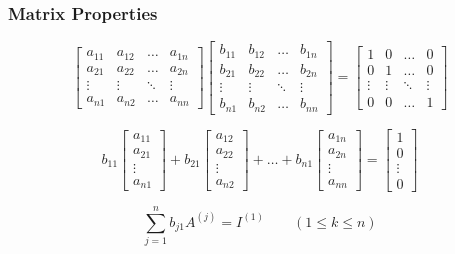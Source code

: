 \documentclass[notheorems,mathserif,table,compress]{beamer}  %
\begin{document}
\begin{frame}
\frametitle{Matrix Properties}
\begin{displaymath}
\begin{bmatrix}
a_{11} & a_{12} & \ldots & a_{1n}\\
a_{21} & a_{22} & \ldots & a_{2n}\\
\vdots & \vdots & \ddots & \vdots \\
a_{n1} & a_{n2} & \ldots & a_{nn}
\end{bmatrix}
\begin{bmatrix}
b_{11} & b_{12} & \ldots & b_{1n}\\
b_{21} & b_{22} & \ldots & b_{2n}\\
\vdots & \vdots & \ddots & \vdots \\
b_{n1} & b_{n2} & \ldots & b_{nn}
\end{bmatrix}
=\begin{bmatrix}
1 & 0 & \ldots & 0 \\
0 & 1 & \ldots & 0 \\
\vdots & \vdots & \ddots & \vdots \\
0 & 0 & \ldots & 1 
\end{bmatrix}
\end{displaymath}

\begin{displaymath}
b_{11}\begin{bmatrix}
a_{11}\\
a_{21}\\
\vdots\\
a_{n1}
\end{bmatrix}
+b_{21}\begin{bmatrix}
a_{12}\\
a_{22}\\
\vdots\\
a_{n2}
\end{bmatrix}+\ldots+b_{n1}
\begin{bmatrix}
a_{1n}\\
a_{2n}\\
\vdots\\
a_{nn}
\end{bmatrix}=
\begin{bmatrix}
1\\
0\\
\vdots\\
0
\end{bmatrix}
\end{displaymath}

\begin{displaymath}
\sum_{j=1}^{n}b_{j1}A^{(j)}=I^{(1)} \qquad (1\leq k\leq n)
\end{displaymath}

\end{frame}
\end{document}
